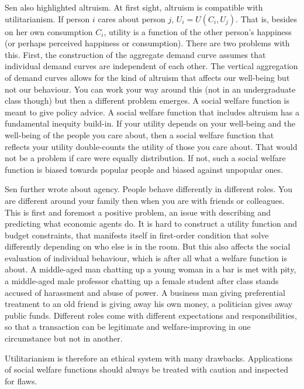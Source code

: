 Sen also highlighted altruism. At first sight, altruism is compatible with utilitarianism. If person $i$ cares about person $j$, $U_i=U(C_i, U_j)$. That is, besides on her own consumption $C_i$, utility is a function of the other person's happiness (or perhaps perceived happiness or consumption). There are two problems with this. First, the construction of the aggregate demand curve assumes that individual demand curves are independent of each other. The vertical aggregation of demand curves allows for the kind of altruism that affects our well-being but not our behaviour. You can work your way around this (not in an undergraduate class though) but then a different problem emerges. A social welfare function is meant to give policy advice. A social welfare function that includes altruism has a fundamental inequity build-in. If your utility depends on your well-being and the well-being of the people you care about, then a social welfare function that reflects your utility double-counts the utility of those you care about. That would not be a problem if care were equally distribution. If not, such a social welfare function is biased towards popular people and biased against unpopular ones.

Sen further wrote about agency. People behave differently in different roles. You are different around your family then when you are with friends or colleagues. This is first and foremost a positive problem, an issue with describing and predicting what economic agents do. It is hard to construct a utility function and budget constraints, that manifests itself in first-order condition that solve differently depending on who else is in the room. But this also affects the social evaluation of individual behaviour, which is after all what a welfare function is about. A middle-aged man chatting up a young woman in a bar is met with pity, a middle-aged male professor chatting up a female student after class stands accused of harassment and abuse of power. A business man giving preferential treatment to an old friend is giving away his own money, a politician gives away public funds. Different roles come with different expectations and responsibilities, so that a transaction can be legitimate and welfare-improving in one circumstance but not in another.

Utilitarianism is therefore an ethical system with many drawbacks. Applications of social welfare functions should always be treated with caution and inspected for flaws.